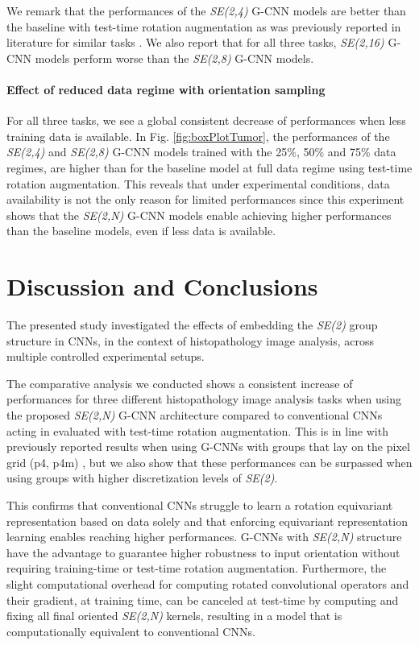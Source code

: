 \documentclass[twocolumn,final]{article}
\newcommand{\se}[1]{\textit{SE(#1)}}
\newcommand{\mset}[2]{}
\begin{document}
We remark that the performances of the \se{2,4} G-CNN models are better than the baseline with test-time rotation augmentation as was previously reported in literature for similar tasks \citep{bekkers2018roto, veeling2018rotation}. We also report that for all three tasks, \se{2,16} G-CNN models perform worse than the \se{2,8} G-CNN models.


\paragraph{Effect of reduced data regime with orientation sampling} 
For all three tasks, we see a global consistent decrease of performances when less training data is available.
In Fig. \ref{fig:boxPlotTumor}, the performances of the \se{2,4} and \se{2,8} G-CNN models trained with the 25\%, 50\% and 75\% data regimes, are higher than for the baseline model at full data regime using test-time rotation augmentation.
This reveals that under experimental conditions, data availability is not the only reason for limited performances since this experiment shows that the \se{2,N} G-CNN models enable achieving higher performances than the baseline models, even if less data is available.


\section{Discussion and Conclusions}
\label{discussion}
The presented study investigated the effects of embedding the \se{2} group structure in CNNs, in the context of histopathology image analysis, across multiple controlled experimental setups.

The comparative analysis we conducted shows a consistent increase of performances for three different histopathology image analysis tasks when using the proposed \se{2,N} G-CNN architecture compared to conventional CNNs acting in \mset{R}{2} evaluated with test-time rotation augmentation.
This is in line with previously reported results when using G-CNNs with groups that lay on the pixel grid (p4, p4m) \citep{cohen2016group, veeling2018rotation}, but we also show that these performances can be surpassed when using groups with higher discretization levels of \se{2}.

This confirms that conventional \mset{R}{2} CNNs struggle to learn a rotation equivariant representation based on data solely and that enforcing equivariant representation learning enables reaching higher performances.
G-CNNs with \se{2,N} structure have the advantage to guarantee higher robustness to input orientation without requiring training-time or test-time rotation augmentation.
Furthermore, the slight computational overhead for computing rotated convolutional operators and their gradient, at training time, can be canceled at test-time by computing and fixing all final oriented \se{2,N} kernels, resulting in a model that is computationally equivalent to conventional \mset{R}{2} CNNs.
\end{document}

